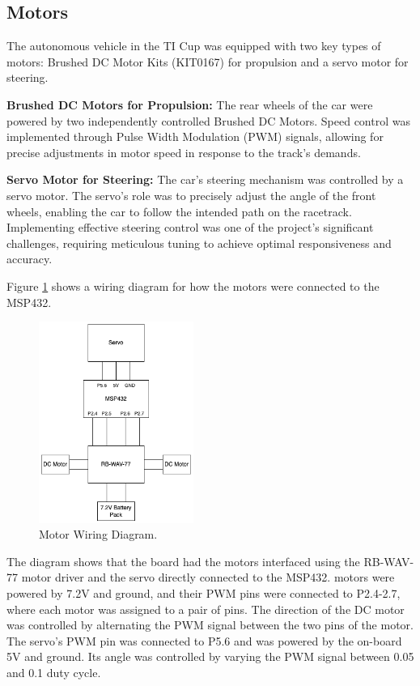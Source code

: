 \documentclass[conference]{IEEEtran}
\begin{document}
\subsection{Motors}

The autonomous vehicle in the TI Cup was equipped with two key types of motors: Brushed DC Motor Kits (KIT0167) for propulsion and a servo motor for steering.

\textbf{Brushed DC Motors for Propulsion:} The rear wheels of the car were powered by two independently controlled Brushed DC Motors. Speed control was implemented through Pulse Width Modulation (PWM) signals, allowing for precise adjustments in motor speed in response to the track's demands.

\textbf{Servo Motor for Steering:} The car's steering mechanism was controlled by a servo motor. The servo's role was to precisely adjust the angle of the front wheels, enabling the car to follow the intended path on the racetrack. Implementing effective steering control was one of the project's significant challenges, requiring meticulous tuning to achieve optimal responsiveness and accuracy.

Figure \ref{fig:motorWiring} shows a wiring diagram for how the motors were connected to the MSP432.

\begin{figure}[htbp]
	\centerline{\includegraphics[width=0.45\textwidth]{images/motorsWiring.png}}
	\caption{Motor Wiring Diagram.}
	\label{fig:motorWiring}
\end{figure}

The diagram shows that the board had the motors interfaced using the RB-WAV-77 motor driver and the servo directly connected to the MSP432. motors were powered by 7.2V and ground, and their PWM pins were connected to P2.4-2.7, where each motor was assigned to a pair of pins. The direction of the DC motor was controlled by alternating the PWM signal between the two pins of the motor. The servo's PWM pin was connected to P5.6 and was powered by the on-board 5V and ground. Its angle was controlled by varying the PWM signal between 0.05 and 0.1 duty cycle.
\end{document}

